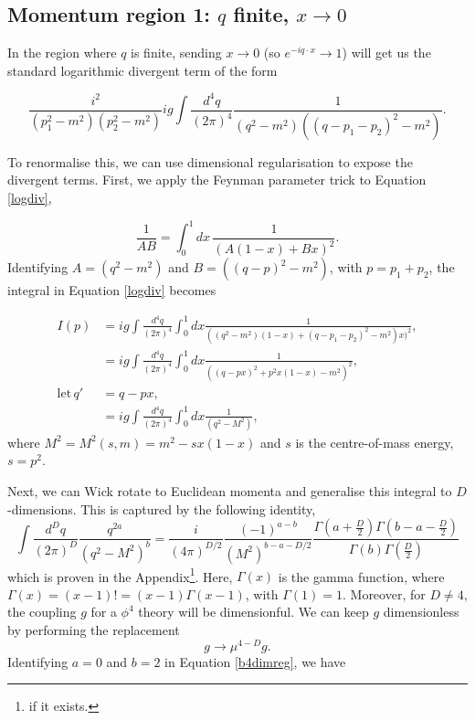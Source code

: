 \documentclass{scrartcl}
\begin{document}
\subsection{Momentum region 1: $q$ finite, $x\rightarrow 0$}

In the region where $q$ is finite, sending $x\rightarrow 0$ (so $e^{-iq\cdot x} \rightarrow 1$) will get  us the standard logarithmic divergent term of the form 

\begin{equation}
    \frac{i^2}{(p_1^2-m^2)(p_2^2-m^2)}ig\int \frac{d^4q}{(2\pi)^4} \frac{1}{(q^2-m^2)((q-p_1-p_2)^2 - m^2)}.
    \label{logdiv}
\end{equation}

To renormalise this, we can use dimensional regularisation to expose the divergent terms. First, we apply the Feynman parameter trick to Equation \ref{logdiv},

\begin{equation}
    \frac{1}{AB} = \int_0^1 dx \, \frac{1}{(A(1-x) + Bx)^2}.
\label{Feynparam trick}
\end{equation}
Identifying $A=(q^2-m^2)$ and $B=((q-p)^2-m^2)$, with $p=p_1+p_2$, the integral in Equation \ref{logdiv} becomes

\begin{equation}
\begin{split}
    I(p) &= ig\int \frac{d^4q}{(2\pi)^4}\int^1_0 dx \frac{1}{((q^2-m^2)(1-x) +(q-p_1-p_2)^2 - m^2)x)^2},\\
    &= ig\int \frac{d^4q}{(2\pi)^4}\int^1_0 dx \frac{1}{((q-px)^2 + p^2x(1-x) - m^2 )^2},\\
    \mathrm{let}\, q'&= q-px,\\
    &= ig\int \frac{d^4q}{(2\pi)^4}\int^1_0 dx \frac{1}{(q^2 -M^2)},
    \label{b4dimreg}
\end{split}
\end{equation}
where $M^2=M^2(s,m)=m^2-sx(1-x)$ and $s$ is the centre-of-mass energy, $s=p^2$.

Next, we can Wick rotate to Euclidean momenta and generalise this integral to $D$-dimensions. This is captured by the following identity, 
\begin{equation}
    \int\frac{d^Dq}{(2\pi)^D} \frac{q^{2a}}{(q^2-M^2)^b}=\frac{i}{(4\pi)^{D/2}}\frac{(-1)^{a-b}}{(M^2)^{b-a-D/2}} \frac{\Gamma(a+\frac{D}{2})\Gamma(b-a-\frac{D}{2})}{\Gamma(b)\Gamma(\frac{D}{2})}
\end{equation}
which is proven in the Appendix\footnote{if it exists.}. Here, $\Gamma(x)$ is the gamma function, where $\Gamma(x) = (x-1)! = (x-1)\Gamma(x-1)$, with $\Gamma(1)=1$. Moreover, for $D\neq 4$, the coupling $g$ for a $\phi^4$ theory will be dimensionful. We can keep $g$ dimensionless by performing the replacement
\begin{equation}
    g \rightarrow \mu^{4-D}g.
\end{equation}
Identifying $a=0$ and $b=2$ in Equation \ref{b4dimreg}, we have 
\end{document}

